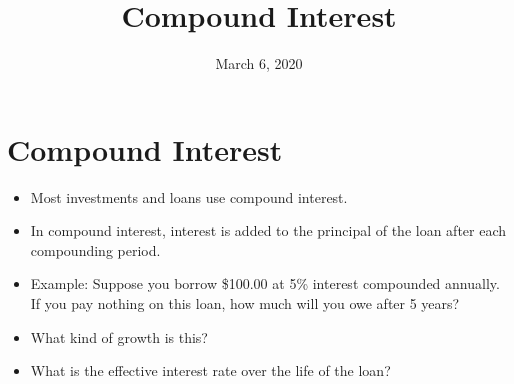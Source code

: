 \documentclass{article}
\title{Compound Interest}
\date{March 6, 2020}
\begin{document}
\maketitle
\section{Compound Interest}
\begin{itemize}
    \item Most investments and loans use compound interest.
    \item In compound interest, interest is added to the principal
        of the loan after each compounding period.
    \item Example:  Suppose you borrow \$100.00 at 5\% interest
        compounded annually. If you pay nothing on this loan, how much
        will you owe after 5 years?
    \item What kind of growth is this?
    \item What is the effective interest rate over the life of the
        loan?
\end{itemize}
\end{document}
